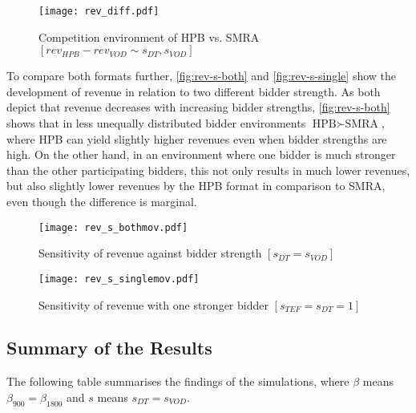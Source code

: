 \begin{figure}[b]
	\centering
	\texttt{[image: rev\_diff.pdf]}
	\caption{Competition environment of HPB vs. SMRA $ [rev_{HPB} - rev_{VOD} \sim s_{DT}, s_{VOD}] $} \label{fig:rev-diff-comp-env}
\end{figure}

To compare both formats further, \autoref{fig:rev-s-both} and \autoref{fig:rev-s-single} show the development of revenue in relation to two different bidder strength. As both depict that revenue decreases with increasing bidder strengths, \autoref{fig:rev-s-both} shows that in less unequally distributed bidder environments $ \text{HPB} \succ \text{SMRA} $, where HPB can yield slightly higher revenues even when bidder strengths are high. On the other hand, in an environment where one bidder is much stronger than the other participating bidders, this not only results in much lower revenues, but also slightly lower revenues by the HPB format in comparison to SMRA, even though the difference is marginal.
  

\begin{figure}[h]
	\centering
	\texttt{[image: rev\_s\_bothmov.pdf]}
	\caption{Sensitivity of revenue against bidder strength $ [s_{DT} = s_{VOD}] $} \label{fig:rev-s-both}
	
	\vspace*{\floatsep}
	
	\texttt{[image: rev\_s\_singlemov.pdf]}
	\caption{Sensitivity of revenue with one stronger bidder $ [s_{TEF} = s_{DT} = 1] $} \label{fig:rev-s-single}
\end{figure}

\subsection{Summary of the Results}
The following table summarises the findings of the simulations, where $ \beta $ means $ \beta_{900} = \beta_{1800} $ and $ s $ means $ s_{DT} = s_{VOD} $.

